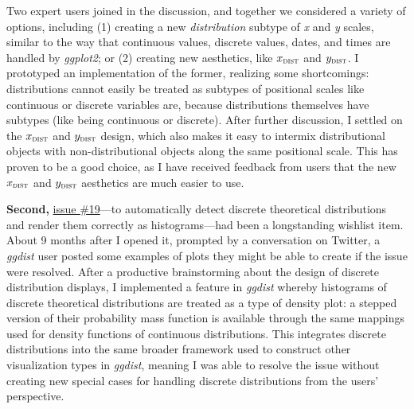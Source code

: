 \documentclass[journal]{vgtc}                     %
\begin{document}
Two expert users joined in the discussion, and together we considered a variety of options, including (1) creating a new \textit{distribution} subtype of \textit{x} and \textit{y} scales, similar to the way that continuous values, discrete values, dates, and times are handled by \textit{ggplot2}; or (2) creating new aesthetics, like $x_\textsc{dist}$ and $y_\textsc{dist}$. I prototyped an implementation of the former, realizing some shortcomings: distributions cannot easily be treated as subtypes of positional scales like continuous or discrete variables are, because distributions themselves have subtypes (like being continuous or discrete). 
After further discussion, I settled on the $x_\textsc{dist}$ and $y_\textsc{dist}$ design, which also makes it easy to intermix distributional objects with non-distributional objects along the same positional scale. This has proven to be a good choice, as I have 
received feedback from users that the new $x_\textsc{dist}$ and $y_\textsc{dist}$ aesthetics are much easier to use.

\textbf{Second,} \href{https://github.com/mjskay/ggdist/issues/19}{issue \#19}---to automatically detect discrete theoretical distributions and render them correctly as histograms---had been a longstanding wishlist item.
About 9 months after I opened it, prompted by a conversation on Twitter, a \textit{ggdist} user posted some examples of plots they might be able to create if the issue were resolved. After a productive brainstorming about the design of discrete distribution displays, I implemented a feature in \textit{ggdist} whereby histograms of discrete theoretical distributions are treated as a type of density plot: a stepped version of their probability mass function is available through the same mappings used for density functions of continuous distributions. This integrates discrete distributions into the same broader framework used to construct other visualization types in \textit{ggdist}, meaning I was able to resolve the issue without creating new special cases for handling discrete distributions from the users' perspective.
\end{document}
